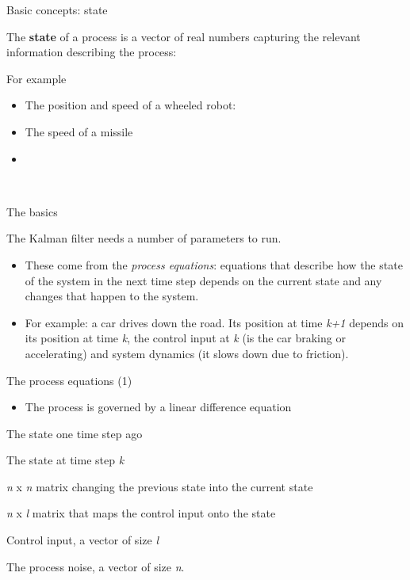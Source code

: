 \documentclass[compress]{beamer}
\providecommand{\tightlist}{%
  \setlength{\itemsep}{0pt}\setlength{\parskip}{0pt}}
\begin{document}
\begin{frame}{Basic concepts: state}

The \textbf{state} of a process is a vector of real numbers capturing
the relevant information describing the process:

For example

\begin{itemize}
\tightlist
\item
  The position and speed of a wheeled robot:
\item
  The speed of a missile
\end{itemize}

\begin{itemize}
\tightlist
\item
  ~
\end{itemize}

~

\end{frame}

\begin{frame}{The basics}

The Kalman filter needs a number of parameters to run.

\begin{itemize}
\tightlist
\item
  These come from the \emph{process equations}: equations that describe
  how the state of the system in the next time step depends on the
  current state and any changes that happen to the system.
\item
  For example: a car drives down the road. Its position at time
  \emph{k+1} depends on its position at time \emph{k}, the control input
  at \emph{k} (is the car braking or accelerating) and system dynamics
  (it slows down due to friction).
\end{itemize}

\end{frame}

\begin{frame}{The process equations (1)}

\begin{itemize}
\tightlist
\item
  The process is governed by a linear difference equation
\end{itemize}

The state one time step ago

The state at time step \emph{k}

\emph{n} x \emph{n} matrix changing the previous state into the current
state

\emph{n} x \emph{l} matrix that maps the control input onto the state

Control input, a vector of size \emph{l}

The process noise, a vector of size \emph{n}.

\end{frame}
\end{document}
